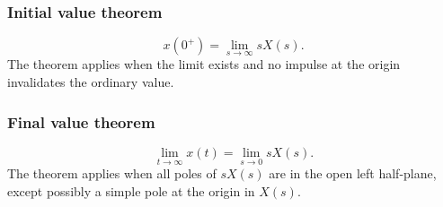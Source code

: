 \subsubsection{Initial value theorem}
\[
x(0^+)=\lim_{s\to\infty}sX(s).
\]
The theorem applies when the limit exists and no impulse at the origin invalidates the ordinary value.

\subsubsection{Final value theorem}
\[
\lim_{t\to\infty}x(t)=\lim_{s\to 0}sX(s).
\]
The theorem applies when all poles of \(sX(s)\) are in the open left half-plane, except possibly a simple pole at the origin in \(X(s)\).
